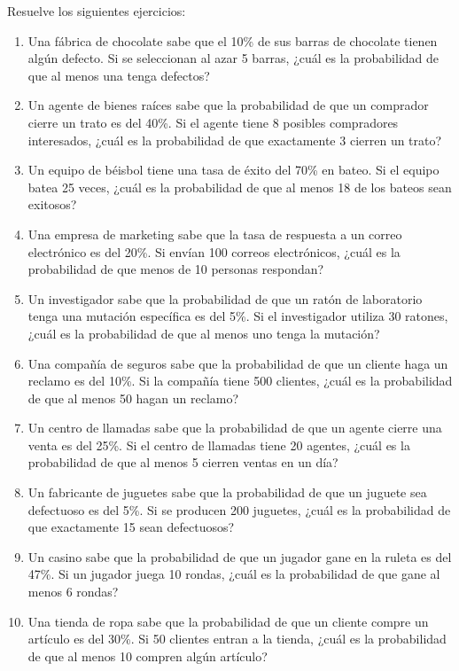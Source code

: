 \begin{Ejer}
Resuelve los siguientes ejercicios:

\begin{enumerate}
    \item Una fábrica de chocolate sabe que el 10\% de sus barras de chocolate tienen algún defecto. Si se seleccionan al azar 5 barras, ¿cuál es la probabilidad de que al menos una tenga defectos?

    \item Un agente de bienes raíces sabe que la probabilidad de que un comprador cierre un trato es del 40\%. Si el agente tiene 8 posibles compradores interesados, ¿cuál es la probabilidad de que exactamente 3 cierren un trato?

    \item Un equipo de béisbol tiene una tasa de éxito del 70\% en bateo. Si el equipo batea 25 veces, ¿cuál es la probabilidad de que al menos 18 de los bateos sean exitosos?

    \item Una empresa de marketing sabe que la tasa de respuesta a un correo electrónico es del 20\%. Si envían 100 correos electrónicos, ¿cuál es la probabilidad de que menos de 10 personas respondan?

    \item Un investigador sabe que la probabilidad de que un ratón de laboratorio tenga una mutación específica es del 5\%. Si el investigador utiliza 30 ratones, ¿cuál es la probabilidad de que al menos uno tenga la mutación?

    \item Una compañía de seguros sabe que la probabilidad de que un cliente haga un reclamo es del 10\%. Si la compañía tiene 500 clientes, ¿cuál es la probabilidad de que al menos 50 hagan un reclamo?

    \item Un centro de llamadas sabe que la probabilidad de que un agente cierre una venta es del 25\%. Si el centro de llamadas tiene 20 agentes, ¿cuál es la probabilidad de que al menos 5 cierren ventas en un día?

    \item Un fabricante de juguetes sabe que la probabilidad de que un juguete sea defectuoso es del 5\%. Si se producen 200 juguetes, ¿cuál es la probabilidad de que exactamente 15 sean defectuosos?

    \item Un casino sabe que la probabilidad de que un jugador gane en la ruleta es del 47\%. Si un jugador juega 10 rondas, ¿cuál es la probabilidad de que gane al menos 6 rondas?

    \item Una tienda de ropa sabe que la probabilidad de que un cliente compre un artículo es del 30\%. Si 50 clientes entran a la tienda, ¿cuál es la probabilidad de que al menos 10 compren algún artículo? 
\end{enumerate}
\end{Ejer}


